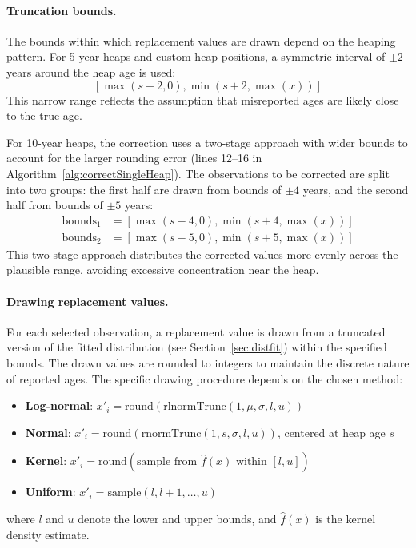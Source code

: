 \documentclass[12pt]{article}
\theoremstyle{plain}
\theoremstyle{definition}
\begin{document}
\paragraph{Truncation bounds.}
The bounds within which replacement values are drawn depend on the heaping pattern. For 5-year heaps and custom heap positions, a symmetric interval of $\pm 2$ years around the heap age is used:
\[
[\max(s - 2, 0), \min(s + 2, \max(x))]
\]
This narrow range reflects the assumption that misreported ages are likely close to the true age.

For 10-year heaps, the correction uses a two-stage approach with wider bounds to account for the larger rounding error (lines 12--16 in Algorithm~\ref{alg:correctSingleHeap}). The observations to be corrected are split into two groups: the first half are drawn from bounds of $\pm 4$ years, and the second half from bounds of $\pm 5$ years:
\begin{align}
\text{bounds}_1 &= [\max(s - 4, 0), \min(s + 4, \max(x))] \\
\text{bounds}_2 &= [\max(s - 5, 0), \min(s + 5, \max(x))]
\end{align}
This two-stage approach distributes the corrected values more evenly across the plausible range, avoiding excessive concentration near the heap.

\paragraph{Drawing replacement values.}
For each selected observation, a replacement value is drawn from a truncated version of the fitted distribution (see Section~\ref{sec:distfit}) within the specified bounds. The drawn values are rounded to integers to maintain the discrete nature of reported ages. The specific drawing procedure depends on the chosen method:
\begin{itemize}
\item \textbf{Log-normal}: $x'_i = \text{round}(\text{rlnormTrunc}(1, \mu, \sigma, l, u))$
\item \textbf{Normal}: $x'_i = \text{round}(\text{rnormTrunc}(1, s, \sigma, l, u))$, centered at heap age $s$
\item \textbf{Kernel}: $x'_i = \text{round}(\text{sample from } \hat{f}(x) \text{ within } [l, u])$
\item \textbf{Uniform}: $x'_i = \text{sample}(l, l{+}1, \ldots, u)$
\end{itemize}
where $l$ and $u$ denote the lower and upper bounds, and $\hat{f}(x)$ is the kernel density estimate.
\end{document}
